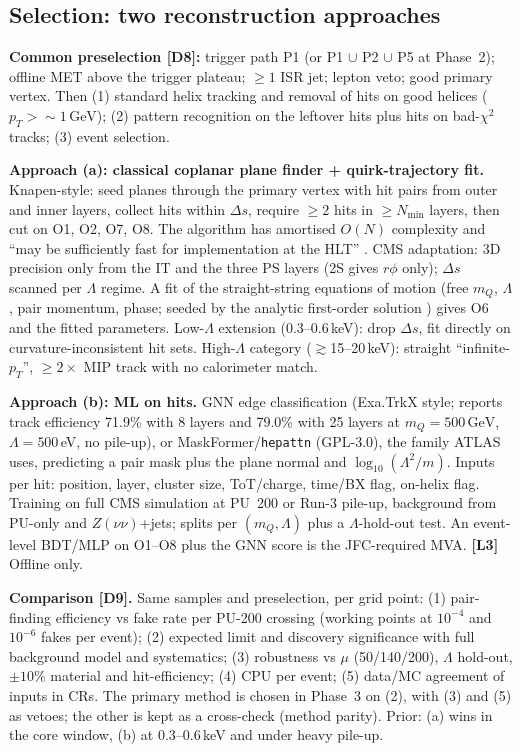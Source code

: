 \documentclass[11pt,a4paper]{article}
\newcommand{\mQ}{m_Q}
\newcommand{\GeV}{\,\mathrm{GeV}}
\newcommand{\lab}[1]{\textbf{[#1]}}
\begin{document}
\subsection{Selection: two reconstruction approaches}
\textbf{Common preselection [D8]:} trigger path P1 (or P1 $\cup$ P2 $\cup$ P5 at Phase~2); offline MET above the trigger plateau; $\geq1$ ISR jet; lepton veto; good primary vertex. Then (1) standard helix tracking and removal of hits on good helices ($p_T>\sim1\GeV$); (2) pattern recognition on the leftover hits plus hits on bad-$\chi^2$ tracks; (3) event selection.

\textbf{Approach (a): classical coplanar plane finder + quirk-trajectory fit.} Knapen-style: seed planes through the primary vertex with hit pairs from outer and inner layers, collect hits within $\Delta s$, require $\geq2$ hits in $\geq N_{\min}$ layers, then cut on O1, O2, O7, O8. The algorithm has amortised $O(N)$ complexity and ``may be sufficiently fast for implementation at the HLT'' \cite{Knapen}. CMS adaptation: 3D precision only from the IT and the three PS layers (2S gives $r\phi$ only); $\Delta s$ scanned per $\Lambda$ regime. A fit of the straight-string equations of motion (free $\mQ$, $\Lambda$, pair momentum, phase; seeded by the analytic first-order solution \cite{traj}) gives O6 and the fitted parameters. Low-$\Lambda$ extension (0.3--0.6\,keV): drop $\Delta s$, fit directly on curvature-inconsistent hit sets. High-$\Lambda$ category ($\gtrsim$15--20\,keV): straight ``infinite-$p_T$'', $\geq2\times$ MIP track with no calorimeter match.

\textbf{Approach (b): ML on hits.} GNN edge classification (Exa.TrkX style; \cite{Sha} reports track efficiency 71.9\% with 8 layers and 79.0\% with 25 layers at $\mQ=500\GeV$, $\Lambda=500$\,eV, no pile-up), or MaskFormer/\texttt{hepattn} (GPL-3.0), the family ATLAS uses, predicting a pair mask plus the plane normal and $\log_{10}(\Lambda^2/m)$. Inputs per hit: position, layer, cluster size, ToT/charge, time/BX flag, on-helix flag. Training on full CMS simulation at PU~200 or Run-3 pile-up, background from PU-only and $Z(\nu\nu)$+jets; splits per $(\mQ,\Lambda)$ plus a $\Lambda$-hold-out test. An event-level BDT/MLP on O1--O8 plus the GNN score is the JFC-required MVA. \lab{L3} Offline only.

\textbf{Comparison [D9].} Same samples and preselection, per grid point: (1) pair-finding efficiency vs fake rate per PU-200 crossing (working points at $10^{-4}$ and $10^{-6}$ fakes per event); (2) expected limit and discovery significance with full background model and systematics; (3) robustness vs $\mu$ (50/140/200), $\Lambda$ hold-out, $\pm10\%$ material and hit-efficiency; (4) CPU per event; (5) data/MC agreement of inputs in CRs. The primary method is chosen in Phase~3 on (2), with (3) and (5) as vetoes; the other is kept as a cross-check (method parity). Prior: (a) wins in the core window, (b) at 0.3--0.6\,keV and under heavy pile-up.
\end{document}
